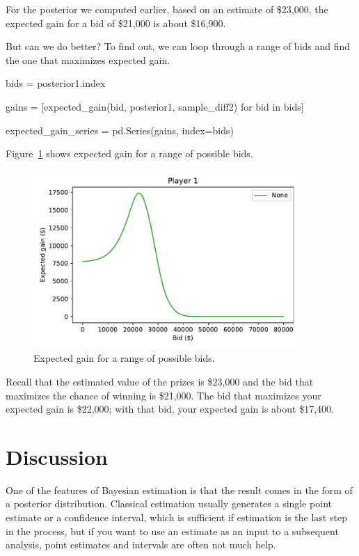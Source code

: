 \documentclass[12pt]{book}
\theoremstyle{exercise}
\begin{document}
For the posterior we computed earlier, based on an estimate of \$23,000, 
the expected gain for a bid of \$21,000
is about \$16,900.

But can we do better? 
To find out, we can loop through a range of bids and find the one that maximizes expected gain.

\begin{code}
bids = posterior1.index

gains = [expected_gain(bid, posterior1, sample_diff2) for bid in bids]

expected_gain_series = pd.Series(gains, index=bids)
\end{code}

Figure~\ref{fig08-06} shows expected gain for a range of possible bids.

\begin{figure}
\centerline{\includegraphics[width=4in]{figs/fig08-06.pdf}}
\caption{Expected gain for a range of possible bids.}
\label{fig08-06}
\end{figure}

Recall that the estimated value of the prizes is \$23,000 and the bid that maximizes the chance of winning is \$21,000.
The bid that maximizes your expected gain is \$22,000; with that bid, your expected gain is about \$17,400.


\section{Discussion}

One of the features of Bayesian estimation is that the
result comes in the form of a posterior distribution.  Classical
estimation usually generates a single point estimate or a confidence
interval, which is sufficient if estimation is the last step in the
process, but if you want to use an estimate as an input to a
subsequent analysis, point estimates and intervals are often not much
help.
\end{document}
